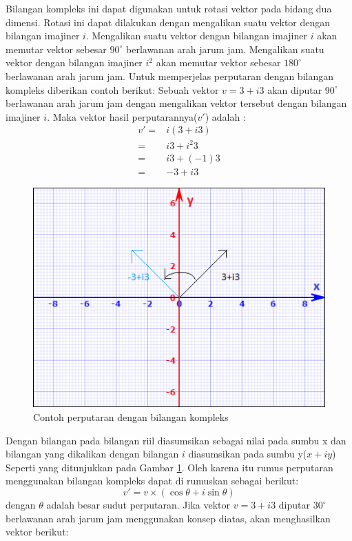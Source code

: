 Bilangan kompleks ini dapat digunakan untuk rotasi vektor pada bidang dua dimensi. Rotasi ini dapat dilakukan dengan mengalikan suatu vektor dengan bilangan imajiner $i$. Mengalikan suatu vektor dengan bilangan imajiner $i$ akan memutar vektor sebesar $90^{\circ}$ berlawanan arah jarum jam. Mengalikan suatu vektor dengan bilangan imajiner $i^2$ akan memutar vektor sebesar $180^{\circ}$ berlawanan arah jarum jam. Untuk memperjelas perputaran dengan bilangan kompleks diberikan contoh berikut:
Sebuah vektor $v = 3 + i3$ akan diputar $90^{\circ}$ berlawanan arah jarum jam dengan mengalikan vektor tersebut dengan bilangan imajiner $i$. Maka vektor hasil perputarannya($v'$) adalah :
\begin{equation}
	\begin{split}
		v' = &i(3 + i3)\\
		= & i3 + i^2 3\\
		= & i3 + (-1) 3\\
		= & -3 + i3
	\end{split}
\label{eq:rotasi_kompleks}
\end{equation}
\begin{figure}[htbp]
\centering
\includegraphics[scale=1]{Gambar/diagram-rotasi-kompleks.png}
\caption{Contoh perputaran dengan bilangan kompleks} 
\label{fig:diagram-rotasi-kompleks}
\end{figure}
Dengan bilangan pada bilangan riil diasumsikan sebagai nilai pada sumbu x dan bilangan yang dikalikan dengan bilangan $i$ diasumsikan pada sumbu y($x + iy$) Seperti yang ditunjukkan pada Gambar \ref{fig:diagram-rotasi-kompleks}. Oleh karena itu rumus perputaran menggunakan bilangan kompleks dapat di rumuskan sebagai berikut: 
\[
	v' = v\times(\cos \theta + i \sin \theta)
\]
dengan $\theta$ adalah besar sudut perputaran. Jika vektor $v = 3 + i3$ diputar $30^{\circ}$ berlawanan arah jarum jam menggunakan konsep diatas, akan menghasilkan vektor berikut:

